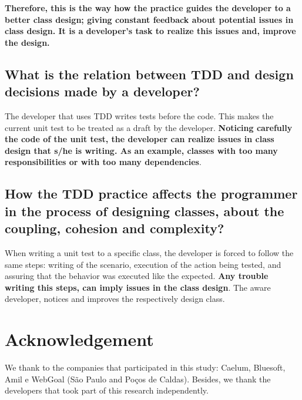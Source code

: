 \documentclass[times]{speauth}
\begin{document}
\textbf{Therefore, this is the way how the practice guides the developer to
a better class design; giving constant feedback about potential issues in
class design. It is a developer's task to realize this issues and, 
improve the design. }

\subsection{What is the relation between TDD and design decisions made by
a developer?}

The developer that uses TDD writes tests before the code. This makes
the current unit test to be treated as a draft by the developer.
\textbf{Noticing carefully the code of the unit test, the developer can
realize issues in class design that s/he is writing. As an example,
classes with too many responsibilities or with too many dependencies}.

\subsection{How the TDD practice affects the programmer in the process of designing
classes, about the coupling, cohesion and complexity?}

When writing a unit test to a specific class, the developer is forced to follow
the same steps: writing of the scenario, execution of the action being
tested, and assuring that the behavior was executed like the
expected.
\textbf{Any trouble writing this steps, can imply issues in the class design}. 
The aware developer, notices and improves the respectively design class.

\section*{Acknowledgement}

We thank to the companies that participated in this study: Caelum, Bluesoft,
Amil e WebGoal (São Paulo and Poços de Caldas). Besides, we thank the
developers that took part of this research independently.
\end{document}
